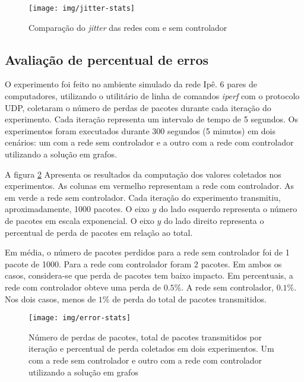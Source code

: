 \begin{figure}[!htb]
    \centering
    \label{fig:jitter-stats}
    \texttt{[image: img/jitter-stats]}
    \caption{Comparação do \emph{jitter} das redes com e sem controlador}
\end{figure}


\subsection{Avaliação de percentual de erros}

O experimento foi feito no ambiente simulado da rede Ipê. 
6 pares de computadores, utilizando o utilitário de linha de comandos 
\emph{iperf} com o protocolo UDP, coletaram o número de perdas de pacotes 
durante cada iteração do experimento.
Cada iteração representa um intervalo de tempo de 5 segundos.
Os experimentos foram executados durante 300 segundos (5 minutos) em dois
cenários: um com a rede sem controlador e a outro com a rede com controlador 
utilizando a solução em grafos.

A figura \ref{fig:error-stats} Apresenta os resultados da computação dos 
valores coletados nos experimentos.
As colunas em vermelho representam a rede com controlador.
As em verde a rede sem controlador.
Cada iteração do experimento transmitiu, aproximadamente, 1000 pacotes.
O eixo $y$ do lado esquerdo representa o número de pacotes em escala 
exponencial.
O eixo $y$ do lado direito representa o percentual de perda de pacotes 
em relação ao total.

Em média, o número de pacotes perdidos para a rede sem controlador foi de
1 pacote de 1000. 
Para a rede com controlador foram 2 pacotes.
Em ambos os casos, considera-se que perda de pacotes tem baixo impacto.
Em percentuais, a rede com controlador obteve uma perda de $0.5 \%$.
A rede sem controlador, $0.1 \%$. 
Nos dois casos, menos de $1 \%$ de perda do total de pacotes transmitidos.

\begin{figure}[!htb]
    \centering
    \label{fig:error-stats}
    \texttt{[image: img/error-stats]}
    \caption{Número de perdas de pacotes, total de pacotes transmitidos por
    iteração e percentual de perda coletados em dois experimentos. Um com a
    rede sem controlador e outro com a rede com controlador utilizando a 
    solução em grafos}
\end{figure}

